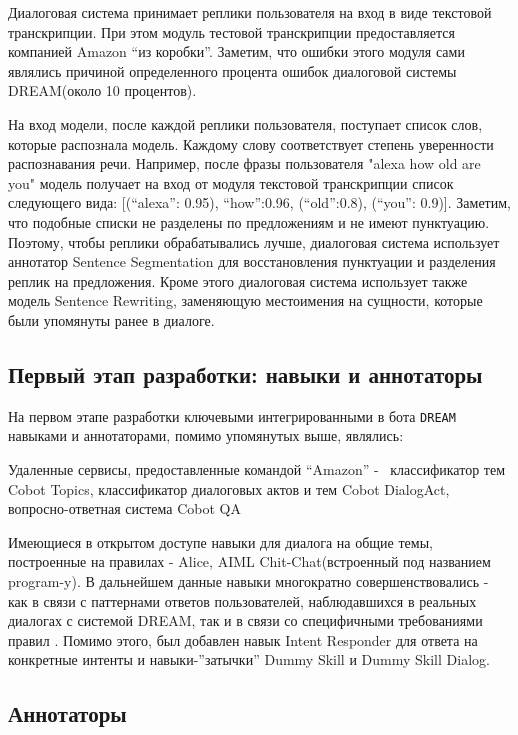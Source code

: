 Диалоговая система принимает реплики пользователя на вход в виде текстовой транскрипции. При этом модуль тестовой транскрипции предоставляется компанией Amazon “из коробки”. Заметим, что ошибки этого модуля сами являлись причиной определенного процента ошибок диалоговой системы DREAM(около 10 процентов).

На вход модели, после каждой реплики пользователя, поступает список слов, которые распознала модель. Каждому слову соответствует степень уверенности распознавания речи. Например, после фразы пользователя "alexa how old are you" модель получает на вход от модуля текстовой транскрипции список следующего вида: [(“alexa”: 0.95), “how”:0.96, (“old”:0.8), (“you”: 0.9)]. Заметим, что подобные списки не разделены по предложениям и не имеют пунктуацию. Поэтому, чтобы реплики обрабатывались лучше, диалоговая система использует аннотатор Sentence Segmentation для восстановления пунктуации и разделения реплик на предложения. Кроме этого диалоговая система использует также модель Sentence Rewriting, заменяющую местоимения на сущности, которые были упомянуты ранее в диалоге.


\subsection{Первый этап разработки: навыки и аннотаторы}

На первом этапе разработки ключевыми интегрированными в бота \texttt{DREAM} навыками и аннотаторами, помимо упомянутых выше, являлись:

Удаленные сервисы, предоставленные командой “Amazon” -  классификатор тем Cobot Topics, классификатор диалоговых актов и тем Cobot DialogAct, вопросно-ответная система Cobot QA

Имеющиеся в открытом доступе навыки для диалога на общие темы, построенные на правилах - Alice, AIML Chit-Chat(встроенный под названием program-y). В дальнейшем данные навыки многократно совершенствовались - как в связи с паттернами ответов пользователей, наблюдавшихся в реальных диалогах с системой DREAM, так и в связи со специфичными требованиями правил \cite{na_website_ndg}. Помимо этого, был добавлен навык Intent Responder для ответа на конкретные интенты и навыки-”затычки” Dummy Skill и Dummy Skill Dialog.

\subsection{Аннотаторы}

